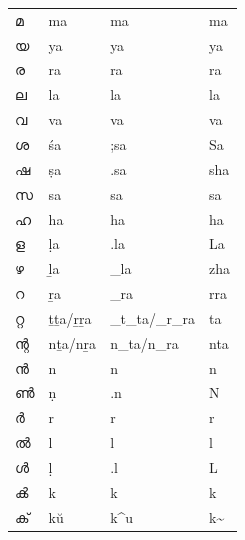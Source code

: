 \documentclass[a4paper]{article}
\begin{document}
\begin{longtable}[l]{p{2.3cm} p{2.3cm} p{2.3cm} p{2.3cm}}
മ & ma & ma & ma \\
യ & ya & ya & ya \\
ര & ra & ra & ra \\
ല & la & la & la \\
വ & va & va & va \\
ശ & śa & ;sa & Sa \\
ഷ & ṣa & .sa & sha \\
സ & sa & sa & sa \\
ഹ & ha & ha & ha \\
ള & ḷa & .la & La \\
ഴ & ḻa & \_la & zha \\
റ & ṟa & \_ra & rra \\
റ്റ & ṯṯa/ṟṟa & \_t\_ta/\_r\_ra & ta \\
ന്റ & nṯa/nṟa & n\_ta/n\_ra & nta \\
ൻ & n & n & n \\
ൺ & ṇ & .n & N \\
ർ & r & r & r \\
ൽ & l & l & l \\
ൾ & ḷ & .l & L \\
ൿ & k & k & k \\
ക് & kŭ & k\textasciicircum{}u & k\textasciitilde \\
\end{longtable}
\end{document}
